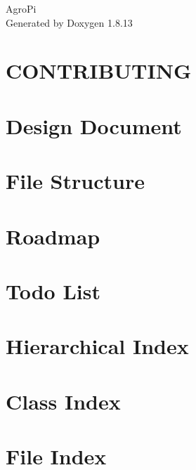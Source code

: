 \documentclass[twoside]{book}
\newcommand{\+}{\discretionary{\mbox{\scriptsize$\hookleftarrow$}}{}{}}
\newcommand{\clearemptydoublepage}{%
  \newpage{\pagestyle{empty}\cleardoublepage}%
}
\begin{document}
\hypersetup{pageanchor=false,
             bookmarksnumbered=true,
             pdfencoding=unicode
            }
\begin{titlepage}
\vspace*{7cm}
\begin{center}%
{\Large Agro\+Pi }\\
\vspace*{1cm}
{\large Generated by Doxygen 1.8.13}\\
\end{center}
\end{titlepage}
\clearemptydoublepage
{}
\tableofcontents
\clearemptydoublepage
{}
\hypersetup{pageanchor=true}

\chapter{C\+O\+N\+T\+R\+I\+B\+U\+T\+I\+NG}
\label{md_docs_CONTRIBUTING}

\chapter{Design Document}
\label{autotoc_md1}

\chapter{File Structure}
\label{autotoc_md16}

\chapter{Roadmap}
\label{autotoc_md17}

\chapter{Todo List}
\label{todo}

\chapter{Hierarchical Index}

\chapter{Class Index}

\chapter{File Index}

\end{document}

